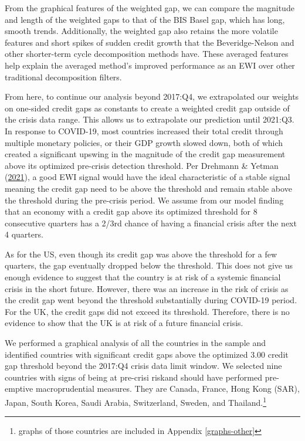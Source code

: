 \documentclass[
  12pt,
]{article}
\begin{document}
From the graphical features of the weighted gap, we can compare the magnitude and length of the weighted gaps to that of the BIS Basel gap, which has long, smooth trends. Additionally, the weighted gap also retains the more volatile features and short spikes of sudden credit growth that the Beveridge-Nelson and other shorter-term cycle decomposition methods have. These averaged features help explain the averaged method's improved performance as an EWI over other traditional decomposition filters.

From here, to continue our analysis beyond 2017:Q4, we extrapolated our weights on one-sided credit gaps as constants to create a weighted credit gap outside of the crisis data range. This allows us to extrapolate our prediction until 2021:Q3. In response to COVID-19, most countries increased their total credit through multiple monetary policies, or their GDP growth slowed down, both of which created a significant upswing in the magnitude of the credit gap measurement above its optimized pre-crisis detection threshold. Per Drehmann \& Yetman (\protect\hyperlink{ref-drehmann_which_2021}{2021}), a good EWI signal would have the ideal characteristic of a stable signal meaning the credit gap need to be above the threshold and remain stable above the threshold during the pre-crisis period. We assume from our model finding that an economy with a credit gap above its optimized threshold for 8 consecutive quarters has a 2/3rd chance of having a financial crisis after the next 4 quarters.

As for the US, even though its credit gap was above the threshold for a few quarters, the gap eventually dropped below the threshold. This does not give us enough evidence to suggest that the country is at risk of a systemic financial crisis in the short future. However, there was an increase in the risk of crisis as the credit gap went beyond the threshold substantially during COVID-19 period. For the UK, the credit gaps did not exceed its threshold. Therefore, there is no evidence to show that the UK is at risk of a future financial crisis.

We performed a graphical analysis of all the countries in the sample and identified countries with significant credit gaps above the optimized 3.00 credit gap threshold beyond the 2017:Q4 crisis data limit window. We selected nine countries with signs of being at pre-crisi riskand should have performed pre-emptive macroprudential measures. They are Canada, France, Hong Kong (SAR), Japan, South Korea, Saudi Arabia, Switzerland, Sweden, and Thailand.\footnote{graphs of those countries are included in Appendix \ref{graphs-other}}
\end{document}
